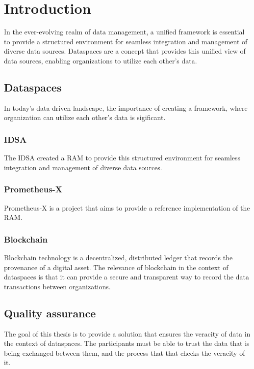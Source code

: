 \chapter{Introduction}

In the ever-evolving realm of data management, a unified framework is essential to provide a structured environment for seamless integration and management of diverse data sources. Dataspaces are a concept that provides this unified view of data sources, enabling organizations to utilize each other's data.

\section{Dataspaces}

In today's data-driven landscape, the importance of creating a framework, where organization can utilize each other's data is sigificant.

\subsection{IDSA}

The \ac{IDSA} created a \ac{RAM}\cite{ids-ram} to provide this structured environment for seamless integration and management of diverse data sources.

\subsection{Prometheus-X}

Prometheus-X is a project that aims to provide a reference implementation of the \ac{RAM}.

\subsection{Blockchain}

Blockchain technology is a decentralized, distributed ledger that records the provenance of a digital asset. The relevance of blockchain in the context of dataspaces is that it can provide a secure and transparent way to record the data transactions between organizations.

\section{Quality assurance}

The goal of this thesis is to provide a solution that ensures the veracity of data in the context of dataspaces. The participants must be able to trust the data that is being exchanged between them, and the process that that checks the veracity of it.

